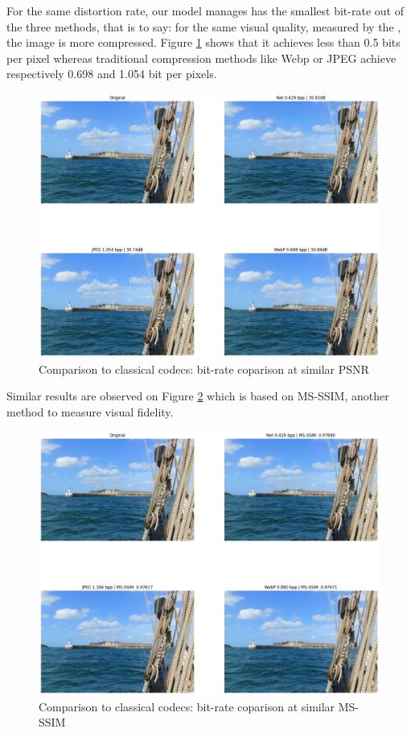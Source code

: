 For the same distortion rate, our model manages has the smallest bit-rate out of the three methods, that is to say: for the same visual quality, measured by the , the image is more compressed. Figure \ref{balle_repro_3} shows that it achieves less than 0.5 bits per pixel whereas traditional compression methods like Webp or JPEG achieve respectively 0.698 and 1.054 bit per pixels.

\begin{figure}
    \centering
    \includegraphics[width=15cm]{img/balle_repro_3.png}
    \caption{Comparison to classical codecs: bit-rate coparison at similar PSNR}
    \label{balle_repro_3}
\end{figure}

Similar results are observed on Figure \ref{balle_repro_4} which is based on MS-SSIM, another method to measure visual fidelity.

\begin{figure}
    \centering
    \includegraphics[width=15cm]{img/balle_repro_4.png}
    \caption{Comparison to classical codecs: bit-rate coparison at similar MS-SSIM}
    \label{balle_repro_4}
\end{figure}

